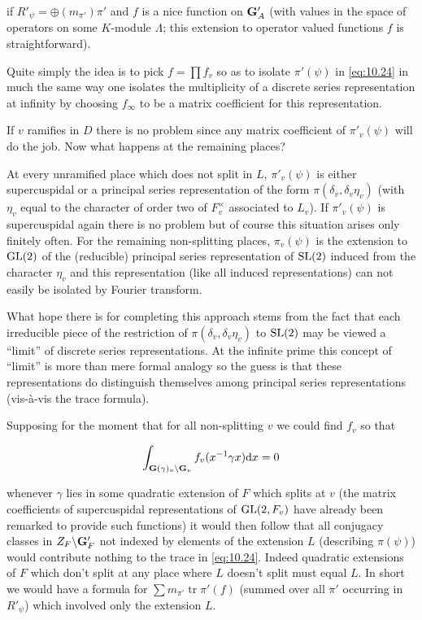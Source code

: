 if $R'_\psi = \oplus (m_{\pi'})\pi'$ and $f$ is a nice function on $\mathbf{G}'_A$ (with values in the space of operators on some $K$-module $\Lambda$; this extension to operator valued functions $f$ is straightforward).

Quite simply the idea is to pick $f = \prod f_v$ so as to isolate $\pi'(\psi)$ in \eqref{eq:10.24} in much the same way one isolates the multiplicity of a discrete series representation at infinity by choosing $f_\infty$ to be a matrix coefficient for this representation.

If $v$ ramifies in $D$ there is no problem since any matrix coefficient of $\pi'_v(\psi)$ will do the job. Now what happens at the remaining places?

At every unramified place which does not split in $L$, $\pi'_v(\psi)$ is either supercuspidal or a principal series representation of the form $\pi(\delta_v, \delta_v\eta_v)$ (with $\eta_v$ equal to the character of order two of $F_v^{\times}$ associated to $L_v$). If $\pi'_v(\psi)$ is supercuspidal again there is no problem but of course this situation arises only finitely often. For the remaining non-splitting places, $\pi_v(\psi)$ is the extension to $\operatorname{GL}(2)$ of the (reducible) principal series representation of $\operatorname{SL}(2)$ induced from the character $\eta_v$ and this representation (like all induced representations) can not easily be isolated by Fourier transform.

What hope there is for completing this approach stems from the fact that each irreducible piece of the restriction of $\pi(\delta_v, \delta_v\eta_v)$ to $\operatorname{SL}(2)$ may be viewed a ``limit'' of discrete series representations. At the infinite prime this concept of ``limit'' is more than mere formal analogy so the guess is that these representations do distinguish themselves among principal series representations (vis-\`a-vis the trace formula).

Supposing for the moment that for all non-splitting $v$ we could find $f_v$ so that

\[
\int_{\mathbf{G}(\gamma)_v \backslash \mathbf{G}_v} f_v(x^{-1}\gamma x) \mathrm{d} x = 0
\]

whenever $\gamma$ lies in some quadratic extension of $F$ which splits at $v$ (the matrix coefficients of supercuspidal representations of $\operatorname{GL}(2, F_v)$ have already been remarked to provide such functions) it would then follow that all conjugacy classes in $Z_F \backslash \mathbf{G}'_F$ not indexed by elements of the extension $L$ (describing $\pi(\psi)$) would contribute nothing to the trace in \eqref{eq:10.24}. Indeed quadratic extensions of $F$ which don't split at any place where $L$ doesn't split must equal $L$. In short we would have a formula for $\sum m_{\pi'} \operatorname{tr} \pi'(f)$ (summed over all $\pi'$ occurring in $R'_\psi$) which involved only the extension $L$.

